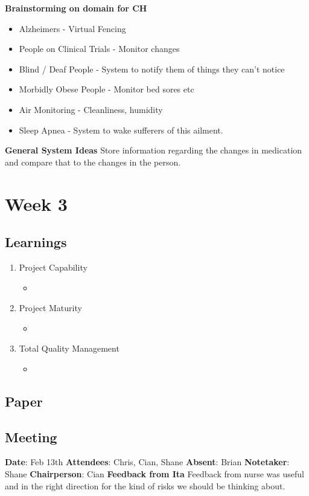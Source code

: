 \textbf{Brainstorming on domain for CH}
\begin{itemize}
\item Alzheimers - Virtual Fencing
\item People on Clinical Trials - Monitor changes
\item Blind / Deaf People - System to notify them of things they can't notice
\item Morbidly Obese People - Monitor bed sores etc
\item Air Monitoring - Cleanliness, humidity
\item Sleep Apnea - System to wake sufferers of this ailment.
\end{itemize}

\textbf{General System Ideas}\newline \newline
Store information regarding the changes in medication and compare that to the changes in the person.
\chapter{Week 3}

\section{Learnings}
\begin{enumerate}
\item Project Capability
\begin{itemize}
\item
\end{itemize}
\item Project Maturity
\begin{itemize}
\item
\end{itemize}
\item Total Quality Management
\begin{itemize}
\item
\end{itemize}
\end{enumerate}

\section{Paper}

\section{Meeting}
\textbf{Date}: Feb 13th\newline
\textbf{Attendees}: Chris, Cian, Shane\newline
\textbf{Absent}: Brian\newline
\textbf{Notetaker}: Shane\newline
\textbf{Chairperson}: Cian\newline \newline
\textbf{Feedback from Ita} \newline \newline
Feedback from nurse was useful and in the right direction for the kind of risks we should be thinking about.

